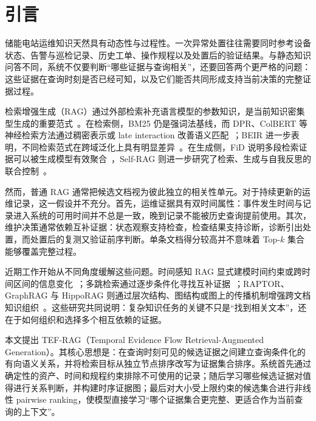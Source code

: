 \section{引言}
\label{sec:introduction}

储能电站运维知识天然具有动态性与过程性。一次异常处置往往需要同时参考设备状态、告警与巡检记录、历史工单、操作规程以及处置后的验证结果。与静态知识问答不同，系统不仅要判断“哪些证据与查询相关”，还要回答两个更严格的问题：这些证据在查询时刻是否已经可知，以及它们能否共同形成支持当前决策的完整证据过程。

检索增强生成（RAG）通过外部检索补充语言模型的参数知识，是当前知识密集型生成的重要范式~\cite{lewis2020rag}。在检索侧，BM25 仍是强词法基线，而 DPR、ColBERT 等神经检索方法通过稠密表示或 late interaction 改善语义匹配~\cite{karpukhin2020dpr,khattab2020colbert}；BEIR 进一步表明，不同检索范式在跨域泛化上具有明显差异~\cite{thakur2021beir}。在生成侧，FiD 说明多段检索证据可以被生成模型有效聚合~\cite{izacard2021fid}，Self-RAG 则进一步研究了检索、生成与自我反思的联合控制~\cite{asai2024selfrag}。

然而，普通 RAG 通常把候选文档视为彼此独立的相关性单元。对于持续更新的运维记录，这一假设并不充分。首先，运维证据具有双时间属性：事件发生时间与记录进入系统的可用时间并不总是一致，晚到记录不能被历史查询提前使用。其次，维护决策通常依赖互补证据：状态观察支持检查，检查结果支持诊断，诊断引出处置，而处置后的复测又验证前序判断。单条文档得分较高并不意味着 Top-$k$ 集合能够覆盖完整过程。

近期工作开始从不同角度缓解这些问题。时间感知 RAG 显式建模时间约束或跨时间区间的信息变化~\cite{zhang2025mrag,lau2025tarag}；多跳检索通过逐步条件化寻找互补证据~\cite{xiong2021mdr,trivedi2023ircot}；RAPTOR、GraphRAG 与 HippoRAG 则通过层次结构、图结构或图上的传播机制增强跨文档知识组织~\cite{sarthi2024raptor,edge2024graphrag,gutierrez2024hipporag}。这些研究共同说明：复杂知识任务的关键不只是“找到相关文本”，还在于如何组织和选择多个相互依赖的证据。

本文提出 TEF-RAG（Temporal Evidence Flow Retrieval-Augmented Generation）。其核心思想是：在查询时刻可见的候选证据之间建立查询条件化的有向语义关系，并将检索目标从独立节点排序改写为证据集合排序。系统首先通过确定性的资产、时间和规程约束排除不可使用的记录；随后学习哪些候选证据对值得进行关系判断，并构建时序证据图；最后对大小受上限约束的候选集合进行非线性 pairwise ranking，使模型直接学习“哪个证据集合更完整、更适合作为当前查询的上下文”。

